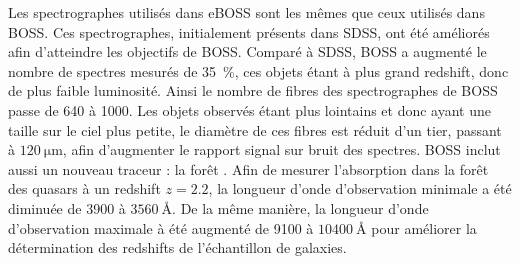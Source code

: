 Les spectrographes utilisés dans eBOSS sont les mêmes que ceux utilisés dans BOSS. Ces spectrographes, initialement présents dans SDSS, ont été améliorés afin d'atteindre les objectifs de BOSS. Comparé à SDSS, BOSS a augmenté le nombre de spectres mesurés de \SI{35}{\percent}, ces objets étant à plus grand redshift, donc de plus faible luminosité. Ainsi le nombre de fibres des spectrographes de BOSS passe de \num{640} à \num{1000}. Les objets observés étant plus lointains et donc ayant une taille sur le ciel plus petite, le diamètre de ces fibres est réduit d'un tier, passant à $\SI{120}{\micro\meter}$, afin d'augmenter le rapport signal sur bruit des spectres. BOSS inclut aussi un nouveau traceur : la forêt \lya{}. Afin de mesurer l'absorption dans la forêt \lya{} des quasars à un redshift $z=\num{2,2}$, la longueur d'onde d'observation minimale a été diminuée de \num{3900} à $\SI{3560}{\angstrom}$. De la même manière, la longueur d'onde d'observation maximale à été augmenté de \num{9100} à $\SI{10400}{\angstrom}$ pour améliorer la détermination des redshifts de l'échantillon de galaxies.

